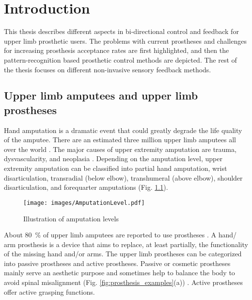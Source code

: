 \chapter{Introduction}


This thesis describes different aspects in bi-directional control and feedback for upper limb prosthetic users. The problems with current prostheses and challenges for increasing prosthesis acceptance rates are first highlighted, and then the pattern-recognition based prosthetic control methods are depicted. The rest of the thesis focuses on different non-invasive sensory feedback methods.

\section{Upper limb amputees and upper limb prostheses }
Hand amputation is a dramatic event that could greatly degrade the life quality of the amputee. There are an estimated three million upper limb amputees all over the world \cite{micera2016staying}. 
The major causes of upper extremity amputation are trauma, dysvascularity, and neoplasia \cite{raichle2008prosthesis}. Depending on the amputation level, upper extremity amputation can be classified into partial hand amputation, wrist disarticulation, transradial (below elbow), transhumeral (above elbow), shoulder disarticulation, and forequarter amputations (Fig. \ref{fig:amputation_level}). 


 \begin{figure}[hbt!]
    \centering
       \texttt{[image: images/AmputationLevel.pdf]}
        \caption{Illustration of amputation levels \cite{cordella2016literature}}
        \label{fig:amputation_level}
\end{figure}


About \SI{80}{\%} of upper limb amputees are reported to use prostheses \cite{ostlie2012prosthesis}. A hand/ arm prosthesis is a device that aims to replace, at least partially, the functionality of the missing hand and/or arms. The upper limb prostheses can be categorized into passive prostheses and active prostheses. Passive or cosmetic prostheses mainly serve an aesthetic purpose and sometimes help to balance the body to avoid spinal misalignment (Fig. \ref{fig:prosthesis_examples}(a)) \cite{castelli2017grasping}. Active prostheses offer active grasping functions. 

